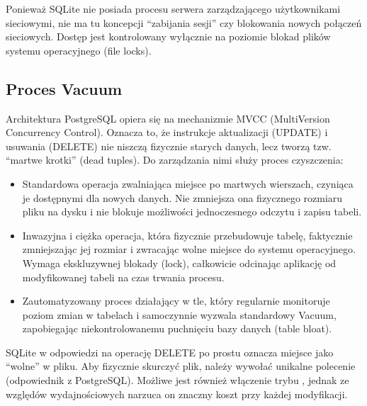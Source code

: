 \documentclass[a4paper,11pt,english,openany,oneside]{sphinxmanual}
\begin{document}
\sphinxAtStartPar
{} Ponieważ SQLite nie posiada procesu serwera zarządzającego użytkownikami sieciowymi, nie ma tu koncepcji “zabijania sesji” czy blokowania nowych połączeń sieciowych. Dostęp jest kontrolowany wyłącznie na poziomie blokad plików systemu operacyjnego (file locks).


\subsection{Proces Vacuum}
\label{\detokenize{rozdzial_2/rozdzial_23/index:proces-vacuum}}
\sphinxAtStartPar
Architektura PostgreSQL opiera się na mechanizmie MVCC (Multi\sphinxhyphen{}Version Concurrency Control). Oznacza to, że instrukcje aktualizacji (UPDATE) i usuwania (DELETE) nie niszczą fizycznie starych danych, lecz tworzą tzw. “martwe krotki” (dead tuples). Do zarządzania nimi służy proces czyszczenia:
\begin{itemize}
\item {} 
\sphinxAtStartPar
{} Standardowa operacja zwalniająca miejsce po martwych wierszach, czyniąca je dostępnymi dla nowych danych. Nie zmniejsza ona fizycznego rozmiaru pliku na dysku i nie blokuje możliwości jednoczesnego odczytu i zapisu tabeli.

\item {} 
\sphinxAtStartPar
{} Inwazyjna i ciężka operacja, która fizycznie przebudowuje tabelę, faktycznie zmniejszając jej rozmiar i zwracając wolne miejsce do systemu operacyjnego. Wymaga ekskluzywnej blokady (lock), całkowicie odcinając aplikację od modyfikowanej tabeli na czas trwania procesu.

\item {} 
\sphinxAtStartPar
{} Zautomatyzowany proces działający w tle, który regularnie monitoruje poziom zmian w tabelach i samoczynnie wyzwala standardowy Vacuum, zapobiegając niekontrolowanemu puchnięciu bazy danych (table bloat).

\end{itemize}

\sphinxAtStartPar
{} SQLite w odpowiedzi na operację DELETE po prostu oznacza miejsce jako “wolne” w pliku. Aby fizycznie skurczyć plik, należy wywołać unikalne polecenie  (odpowiednik  z PostgreSQL). Możliwe jest również włączenie trybu , jednak ze względów wydajnościowych narzuca on znaczny koszt przy każdej modyfikacji.
\end{document}

